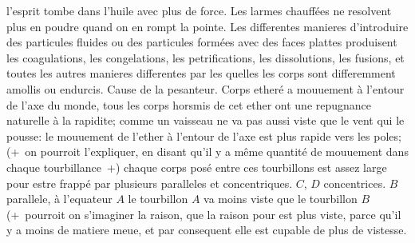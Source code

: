 l'esprit tombe dans l'huile\protect{} avec plus de force.
Les larmes\protect{} chauff\'{e}es ne resolvent plus en
poudre\protect{} quand on en rompt la pointe.%
%
\pend%
\pstart%
Les differentes manieres d'introduire des particules\protect{} fluides ou des
particules\protect{} form\'{e}es avec des faces plattes produisent les \protect{}coagulations, les congelations, les petrifications, les dissolutions, les fusions, et toutes les autres manieres differentes par les quelles les corps sont differemment amollis ou endurcis.%
\pend%
\count{}
\count{}
\pstart%
Cause
%
de la pesanteur.\protect{} Corps ether\'{e} a mouuement \`{a} l'entour de l'axe\protect{} du monde, tous les corps horsmis de
cet ether\protect{}
ont une repugnance\protect{} naturelle \`{a} la rapidite; comme un vaisseau\protect{} ne va pas aussi
viste que le vent\protect{} qui le pousse: le mouuement de l'ether\protect{} \`{a} l'entour de l'axe\protect{} est plus
rapide vers les poles;
(+~on pourroit l'expliquer, en disant qu'il y a même quantit\'{e} de mouuement
dans chaque \protect{}tourbillance~+)
chaque corps pos\'{e} entre ces tourbillons\protect{}
est assez large pour estre frapp\'{e} par plusieurs paralleles et concentriques. $C$, $D$ concentrices. $B$ parallele, \`{a} l'equateur $A$ le tourbillon\protect{} $A$ va moins viste que le tourbillon\protect{} $B$ (+~pourroit on s'imaginer la raison, que la raison pour
 est plus viste,
parce qu'il y a moins de matiere meue, et par consequent elle est cupable de plus de
vistesse. 
